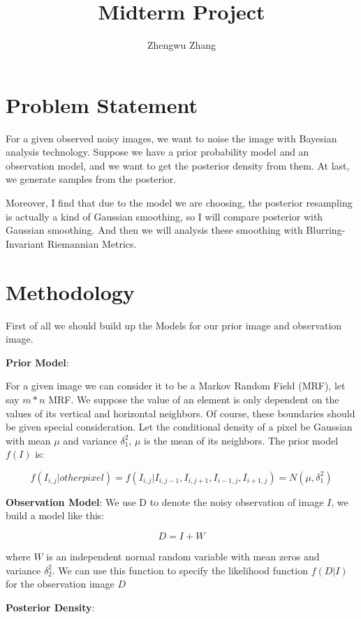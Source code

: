 \documentclass[11pt] {article}
\author{Zhengwu Zhang}
\title{Midterm Project}
\begin{document}
 

\maketitle
\newpage

\section{Problem Statement}

For a given observed noisy images, we want to noise the image with Bayesian analysis technology. Suppose we have a prior probability model and an observation model, and we want to get the posterior density from them. At last, we generate samples from the posterior. 

Moreover, I find that due to the model we are choosing, the posterior resampling is actually a kind of Gaussian smoothing, so I will compare posterior with Gaussian smoothing. And then we will analysis these smoothing with Blurring-Invariant Riemannian Metrics. 

\section{Methodology}

First of all we should build up the Models for our prior image and observation image. 

\noindent \textbf{Prior Model}: 

For a given image we can consider it to be a Markov Random Field (MRF), let say $m*n$ MRF.  We suppose the value of an element is only dependent on the values of its vertical and horizontal neighbors. Of course, these boundaries should be given special consideration.  Let the conditional density of a pixel be Gaussian with mean $\mu$ and variance $\delta_1^2$, $\mu$ is the mean of its neighbors. The prior model $f(I)$ is:

$$f(I_{i,j}|other pixel)=f(I_{i,j}|I_{i,j-1},I_{i,j+1},I_{i-1,j},I_{i+1,j})=N(\mu,\delta_1^2) $$

\noindent \textbf{Observation Model}: We use D to denote the noisy observation of image $I$, we build a model like this:

$$D=I+W$$

where $W$ is an independent normal random variable with mean zeros and variance $\delta_2^2$. We can use this function to specify the likelihood function $f(D|I)$ for the observation image $D$

\noindent \textbf{Posterior Density}: 
\end{document}
